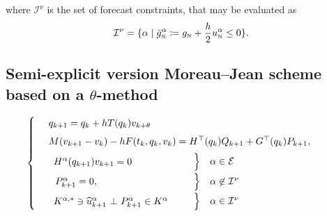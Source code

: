 where $\mathcal I^\nu$ is the set of forecast constraints, that may be evaluated as
\begin{equation}
  \label{eq:101}
  \mathcal I^\nu = \{\alpha \mid \bar g_{\hbox{\tiny{N}}}^\alpha \coloneqq g_{\hbox{\tiny{N}}} + \frac h 2 u^\alpha_{\hbox{\tiny{N}}} \leq 0\}.
\end{equation}


\subsection{Semi-explicit version Moreau--Jean scheme based on a  $\theta$-method}

\begin{equation}
    \label{eq:Moreau--Jean-explicit}
    \begin{cases}
      ~~\begin{array}{l}
        q_{k+1} = q_{k} + h T(q_{k}) v_{k+\theta} \quad \\[1ex]
        M(v_{k+1}-v_k) - h  F(t_{k}, q_{k},v_{k}) =  H^\top(q_{k}) Q_{k+1}+  G^\top(q_{k}) P_{k+1},\quad\,\\[1ex]
      \end{array}\\
      ~~\begin{array}{lcl}
        \begin{array}{l}
          H^\alpha(q_{k+1}) v_{k+1}  =  0\\
        \end{array} & \left. \begin{array}{l}
          \vphantom{H^\alpha(q_{k+1}) v_{k+1}  =  0}\\[1ex]
        \end{array}\right\}    &\alpha \in \mathcal E  \\[1ex]
      ~~P_{k+1}^\alpha= 0, &
      \left. \begin{array}{l}
          \vphantom{P_{k+1}^\alpha= 0,  \delta^\alpha_{k+1}=0}\\[1ex]
        \end{array}\right\}   & \alpha \not\in \mathcal I^\nu \\[1ex]
      \begin{array}{l}
          {K}^{\alpha,*} \ni \widehat u_{k+1}^\alpha~ \bot~ P_{k+1}^\alpha \in {K}^\alpha \\
      \end{array} &
      \left.\begin{array}{l}
          \vphantom{{K}^{\alpha,*} \ni \widehat u_{k+1}^\alpha~ \bot~ P_{k+1}^\alpha \in {K}^\alpha} \\
        \end{array}\right\}
      &\alpha \in \mathcal I^\nu\\
  \end{array}
\end{cases}
\end{equation}

